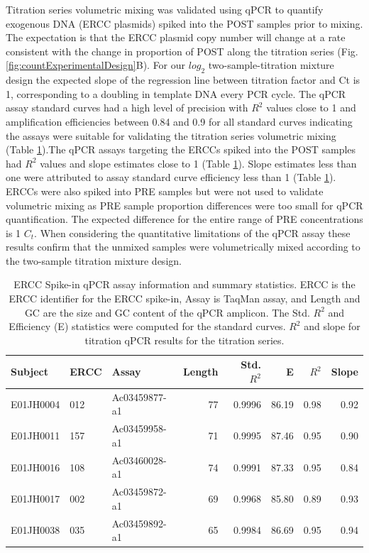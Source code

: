 \documentclass[linenumbers]{bmcart}
\begin{document}
Titration series volumetric mixing was validated using qPCR to quantify exogenous
DNA (ERCC plasmids) spiked into the POST samples prior to mixing.
The expectation is that the ERCC plasmid copy number will change at a rate consistent
with the change in proportion of POST along  the titration series (Fig. \ref{fig:countExperimentalDesign}B).
For our \(log_2\) two-sample-titration mixture design the expected slope of the
regression line between titration factor and Ct is 1, corresponding to a
doubling in template DNA every PCR cycle. The qPCR assay
standard curves had a high level of precision with \(R^2\) values close
to 1 and amplification efficiencies between 0.84 and 0.9 for all
standard curves indicating the assays were suitable for validating the
titration series volumetric mixing (Table \ref{tab:erccTable}).The qPCR assays targeting the
ERCCs spiked into the POST samples had \(R^2\) values and slope
estimates close to 1 (Table \ref{tab:erccTable}). Slope estimates less
than one were attributed to assay standard curve efficiency less than 1
(Table \ref{tab:erccTable}). ERCCs were also spiked into PRE samples but were not used
to validate volumetric mixing as PRE sample proportion differences were
too small for qPCR quantification. The expected difference for
the entire range of PRE concentrations is 1 \(C_t\). When considering the
quantitative limitations of the qPCR assay these results confirm that
the unmixed samples were volumetrically mixed according to the
two-sample titration mixture design.

\begin{table}

\caption{\label{tab:erccTable}ERCC Spike-in qPCR assay information and summary statistics. ERCC is the ERCC identifier for the ERCC spike-in, Assay is TaqMan assay, and Length and GC are the size and GC content of the qPCR amplicon.  The Std. $R^2$ and Efficiency (E) statistics were computed for the standard curves. $R^2$ and slope for titration qPCR results for the titration series.}
\centering
\begin{tabular}[t]{lllrrrrr}
\toprule
Subject & ERCC & Assay & Length & Std. $R^2$ & E & $R^2$ & Slope\\
\midrule
E01JH0004 & 012 & Ac03459877-a1 & 77 & 0.9996 & 86.19 & 0.98 & 0.92\\
E01JH0011 & 157 & Ac03459958-a1 & 71 & 0.9995 & 87.46 & 0.95 & 0.90\\
E01JH0016 & 108 & Ac03460028-a1 & 74 & 0.9991 & 87.33 & 0.95 & 0.84\\
E01JH0017 & 002 & Ac03459872-a1 & 69 & 0.9968 & 85.80 & 0.89 & 0.93\\
E01JH0038 & 035 & Ac03459892-a1 & 65 & 0.9984 & 86.69 & 0.95 & 0.94\\
\bottomrule
\end{tabular}
\end{table}
\end{document}
